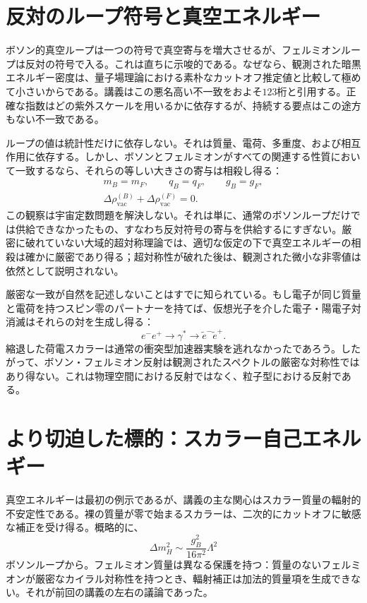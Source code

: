 \section{反対のループ符号と真空エネルギー}

ボソン的真空ループは一つの符号で真空寄与を増大させるが、フェルミオンループは反対の符号で入る。これは直ちに示唆的である。なぜなら、観測された暗黒エネルギー密度は、量子場理論における素朴なカットオフ推定値と比較して極めて小さいからである。講義はこの悪名高い不一致をおよそ\(123\)桁と引用する。正確な指数はどの紫外スケールを用いるかに依存するが、持続する要点はこの途方もない不一致である。

ループの値は統計性だけに依存しない。それは質量、電荷、多重度、および相互作用に依存する。しかし、ボソンとフェルミオンがすべての関連する性質において一致するなら、それらの等しい大きさの寄与は相殺し得る：
\begin{equation}
\begin{gathered}
m_B=m_F,\qquad q_B=q_F,\qquad g_B=g_F,\\
\Delta\rho_{\mathrm{vac}}^{(B)}
+\Delta\rho_{\mathrm{vac}}^{(F)}=0.
\end{gathered}
\end{equation}
この観察は宇宙定数問題を解決しない。それは単に、通常のボソンループだけでは供給できなかったもの、すなわち反対符号の寄与を供給するにすぎない。厳密に破れていない大域的超対称理論では、適切な仮定の下で真空エネルギーの相殺は確かに厳密であり得る；超対称性が破れた後は、観測された微小な非零値は依然として説明されない。

厳密な一致が自然を記述しないことはすでに知られている。もし電子が同じ質量と電荷を持つスピン零のパートナーを持てば、仮想光子を介した電子・陽電子対消滅はそれらの対を生成し得る：
\begin{equation}
e^-e^+\longrightarrow\gamma^*
\longrightarrow\widetilde e^-\widetilde e^+.
\end{equation}
縮退した荷電スカラーは通常の衝突型加速器実験を逃れなかったであろう。したがって、ボソン・フェルミオン反射は観測されたスペクトルの厳密な対称性ではあり得ない。これは物理空間における反射ではなく、粒子型における反射である。

\section{より切迫した標的：スカラー自己エネルギー}

真空エネルギーは最初の例示であるが、講義の主な関心はスカラー質量の輻射的不安定性である。裸の質量が零で始まるスカラーは、二次的にカットオフに敏感な補正を受け得る。概略的に、
\begin{equation}
\Delta m_H^2\sim \frac{g_B^2}{16\pi^2}\Lambda^2
\end{equation}
ボソンループから。フェルミオン質量は異なる保護を持つ：質量のないフェルミオンが厳密なカイラル対称性を持つとき、輻射補正は加法的質量項を生成できない。それが前回の講義の左右の議論であった。


